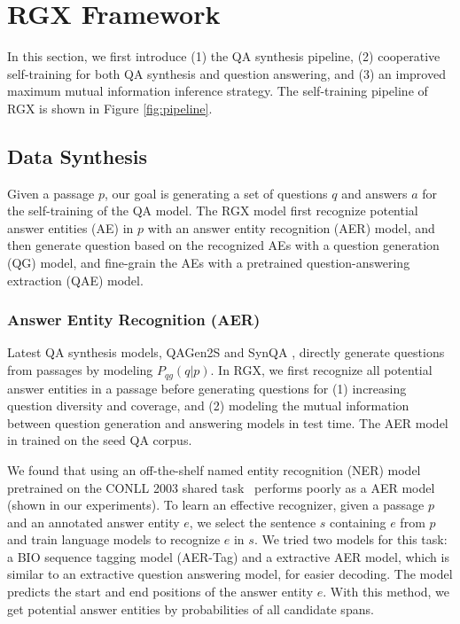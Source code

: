 \documentclass[11pt,a4paper]{article}
\begin{document}
\section{RGX Framework}
In this section, we first introduce (1) the QA synthesis pipeline, (2) cooperative self-training for both QA synthesis and question answering, and (3) an improved maximum mutual information inference strategy. The self-training pipeline of RGX is shown in Figure \ref{fig:pipeline}.



\subsection{Data Synthesis}
Given a passage $p$, our goal is generating a set of questions $q$ and answers $a$ for the self-training of the QA model. The RGX model first recognize potential answer entities (AE) in $p$ with an answer entity recognition (AER) model, and then generate question based on the recognized AEs with a question generation (QG) model, and fine-grain the AEs with a pretrained question-answering extraction (QAE) model.






\subsubsection{Answer Entity Recognition (AER)}
\label{sec:aer-st}
Latest QA synthesis models, QAGen2S \cite{shakeri2020end} and SynQA \cite{bartolo2021improving}, directly generate questions from passages by modeling  $P_{qg}(q | p)$. In RGX, we first recognize all potential answer entities in a passage before generating questions for (1) increasing question diversity and coverage, and (2) modeling the mutual information between question generation and answering models in test time. The AER model in trained on the seed QA corpus.

We found that using an off-the-shelf named entity recognition (NER) model pretrained on the CONLL 2003 shared task~\cite{bender2003conll} performs poorly as a AER model (shown in our experiments). To learn an effective recognizer, given a passage $p$ and an annotated answer entity $e$, we select the sentence $s$ containing $e$ from $p$ and train language models to recognize $e$ in $s$. We tried two models for this task: a BIO sequence tagging model (AER-Tag) and a extractive AER model, which is similar to an extractive question answering model, for easier decoding. The model predicts the start and end positions of the answer entity $e$. With this method, we get potential answer entities by probabilities of all candidate spans. 
\end{document}
